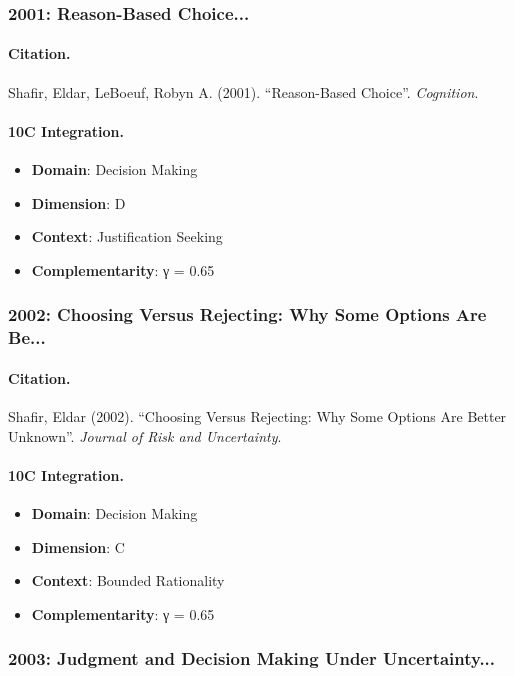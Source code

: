 \subsubsection{2001: Reason-Based Choice...}

\paragraph{Citation.}
Shafir, Eldar, LeBoeuf, Robyn A. (2001). ``Reason-Based Choice''. \textit{Cognition}.

\paragraph{10C Integration.}
\begin{itemize}[nosep]
  \item \textbf{Domain}: Decision Making
  \item \textbf{Dimension}: D
  \item \textbf{Context}: Justification Seeking
  \item \textbf{Complementarity}: γ = 0.65
\end{itemize}


\subsubsection{2002: Choosing Versus Rejecting: Why Some Options Are Be...}

\paragraph{Citation.}
Shafir, Eldar (2002). ``Choosing Versus Rejecting: Why Some Options Are Better Unknown''. \textit{Journal of Risk and Uncertainty}.

\paragraph{10C Integration.}
\begin{itemize}[nosep]
  \item \textbf{Domain}: Decision Making
  \item \textbf{Dimension}: C
  \item \textbf{Context}: Bounded Rationality
  \item \textbf{Complementarity}: γ = 0.65
\end{itemize}


\subsubsection{2003: Judgment and Decision Making Under Uncertainty...}

